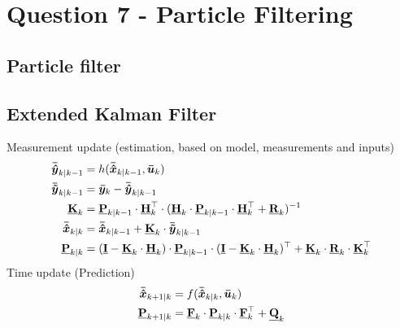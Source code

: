 \chapter{Question 7 - Particle Filtering}

\section{Particle filter} %
\label{sec:particle_filter}


\section{Extended Kalman Filter} %
\label{sec:extended_kalman_filter}
Measurement update (estimation, based on model, measurements and inputs)
\begin{equation}
        \begin{split}
              \bm{\bar{\hat{y}}}_{k \vert k-1} &= h(\bm{\bar{\hat{x}}}_{k \vert k-1},\bm{\bar{u}}_k) \\
              \bm{\bar{\tilde{y}}}_{k \vert k-1} &= \bm{\bar{y}}_{k} - \bm{\bar{\hat{y}}}_{k \vert k-1} \\
              \mathbf{\underline{{K}}}_k &= \mathbf{\underline{{P}}}_{k \vert k-1} \cdot \mathbf{\underline{{H}}}_{k} ^\top \cdot (\mathbf{\underline{{H}}}_k \cdot \mathbf{\underline{{P}}}_{k \vert k-1} \cdot \mathbf{\underline{{H}}}_{k} ^\top + \mathbf{\underline{{R}}}_k )^{-1}  \\
              \bm{\bar{\hat{x}}}_{k \vert k} &= \bm{\bar{\hat{x}}}_{k \vert k-1} + \mathbf{\underline{{K}}}_k \cdot \bm{\bar{\tilde{y}}}_{k \vert k-1} \\
              \mathbf{\underline{{P}}}_{k \vert k} &= (\mathbf{\underline{{I}}} - \mathbf{\underline{{K}}}_k \cdot \mathbf{\underline{{H}}}_k) \cdot \mathbf{\underline{{P}}}_{k \vert k-1} \cdot (\mathbf{\underline{{I}}} - \mathbf{\underline{{K}}}_k \cdot \mathbf{\underline{{H}}}_k) ^\top + \mathbf{\underline{{K}}}_k \cdot \mathbf{\underline{{R}}}_k \cdot \mathbf{\underline{{K}}}_k ^\top
        \end{split}
\end{equation}
Time update (Prediction)
\begin{equation}
\begin{split}
        \bm{\bar{\hat{x}}}_{k+1 \vert k} &= f(\bm{\bar{\hat{x}}}_{k \vert k}, \bm{\bar{u}}_k) \\
        \mathbf{\underline{{P}}}_{k +1 \vert k} &= \mathbf{\underline{{F}}}_k \cdot \mathbf{\underline{{P}}}_{k \vert k} \cdot \mathbf{\underline{{F}}}_{k}^\top + \mathbf{\underline{{Q}}}_k
\end{split}
\end{equation}

